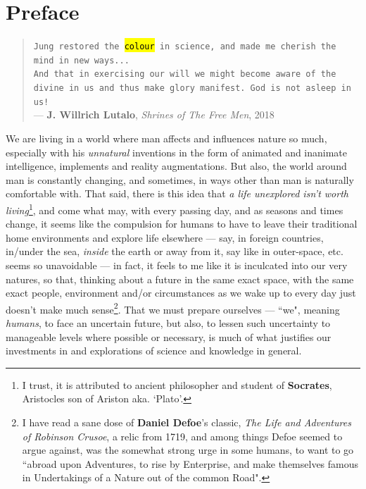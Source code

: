\documentclass[a4paper, 18pt]{book} %
\begin{document}
\chapter{Preface}
\label{SECPREFACE}

\begin{quotation}
\noindent \texttt{Jung restored the \hl{colour} in science, and made me cherish the mind in new ways...}\\
\texttt{And that in exercising our will we might become aware of the divine in us and thus make glory manifest. God is not asleep in us!}\\
\hspace*{\fill} --- \textbf{J. Willrich Lutalo}, \textit{Shrines of The Free Men}, 2018\cite{shrinesjwl}
\end{quotation}

We are living in a world where man affects and influences nature so much, especially with his \textit{unnatural} inventions in the form of animated and inanimate intelligence, implements and reality augmentations. But also, the world around man is constantly changing, and sometimes, in ways other than man is naturally comfortable with. That said, there is this idea that \textit{a life unexplored isn't worth living}\footnote{I trust, it is attributed to ancient philosopher and student of \textbf{Socrates}, Aristocles son of Ariston aka. `Plato'.}, and come what may, with every passing day, and as seasons and times change, it seems like the compulsion for humans to have to leave their traditional home environments and explore life elsewhere --- say, in foreign countries, in/under the sea, \textit{inside} the earth or away from it, say like in outer-space, etc. seems so unavoidable --- in fact, it feels to me like it is inculcated into our very natures, so that, thinking about a future in the same exact space, with the same exact people, environment and/or circumstances as we wake up to every day just doesn't make much sense\footnote{I have read a sane dose of \textbf{Daniel Defoe}'s classic, \textit{The Life and Adventures of Robinson Crusoe}, a relic from 1719, and among things Defoe seemed to argue against, was the somewhat strong urge in some humans, to want to go ``abroad upon Adventures, to rise by Enterprise, and make themselves famous in Undertakings of a Nature out of the common Road".}. That we must prepare ourselves --- ``we", meaning \textit{humans}, to face an uncertain future, but also, to lessen such uncertainty to manageable levels where possible or necessary, is much of what justifies our investments in and explorations of science and knowledge in general. 
\end{document}
